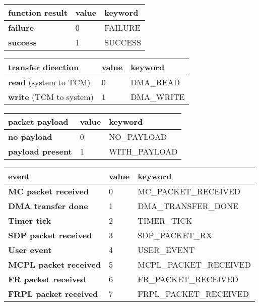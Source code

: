 \documentclass[11pt,a4paper,twoside]{article}
\begin{document}
\begin{center}
\renewcommand{\arraystretch}{1.2}
\begin{tabularx}{\textwidth}{| p{\fcw} X X |}
\hline
\textbf{function result} & \textbf{value} & \textbf{keyword} \\%
\hline
\hline
\textbf{failure} & 0 & FAILURE \\%
\textbf{success} & 1 & SUCCESS \\%
\hline
\end{tabularx}
\end{center}

\begin{center}
\renewcommand{\arraystretch}{1.2}
\begin{tabularx}{\textwidth}{| p{\fcw} X X |}
\hline
\textbf{transfer direction} & \textbf{value} & \textbf{keyword} \\%
\hline
\hline
\textbf{read} (system to TCM) & 0 & DMA\_READ \\%
\textbf{write} (TCM to system) & 1 & DMA\_WRITE \\%
\hline
\end{tabularx}
\end{center}


\begin{center}
\renewcommand{\arraystretch}{1.2}
\begin{tabularx}{\textwidth}{| p{\fcw} X X |}
\hline
\textbf{packet payload} & \textbf{value} & \textbf{keyword} \\%
\hline
\hline
\textbf{no payload} & 0 & NO\_PAYLOAD \\%
\textbf{payload present} & 1 & WITH\_PAYLOAD \\%
\hline
\end{tabularx}
\end{center}

\begin{center}
\renewcommand{\arraystretch}{1.2}
\begin{tabularx}{\textwidth}{| p{\fcw} X X |}
\hline
\textbf{event} & \textbf{value} & \textbf{keyword} \\%
\hline
\hline
\textbf{MC packet received} & 0 & MC\_PACKET\_RECEIVED \\%
\textbf{DMA transfer done} & 1 & DMA\_TRANSFER\_DONE \\%
\textbf{Timer tick} & 2 & TIMER\_TICK \\%
\textbf{SDP packet received} & 3 & SDP\_PACKET\_RX \\%
\textbf{User event} & 4 & USER\_EVENT \\%
\textbf{MCPL packet received} & 5 & MCPL\_PACKET\_RECEIVED \\%
\textbf{FR packet received} & 6 & FR\_PACKET\_RECEIVED \\%
\textbf{FRPL packet received} & 7 & FRPL\_PACKET\_RECEIVED \\%
\hline
\end{tabularx}
\end{center}
\end{document}
